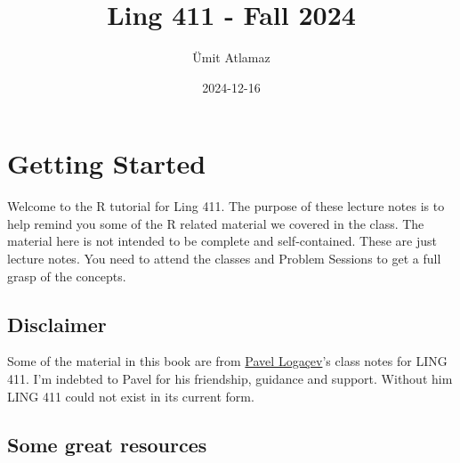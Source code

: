 \documentclass[
]{book}
\title{Ling 411 - Fall 2024}
\author{Ümit Atlamaz}
\date{2024-12-16}
\newenvironment{Shaded}{\begin{snugshade}}{\end{snugshade}}
\newcommand{\AttributeTok}[1]{\textcolor[rgb]{0.13,0.29,0.53}{#1}}
\newcommand{\CommentTok}[1]{\textcolor[rgb]{0.56,0.35,0.01}{\textit{#1}}}
\newcommand{\DecValTok}[1]{\textcolor[rgb]{0.00,0.00,0.81}{#1}}
\newcommand{\FunctionTok}[1]{\textcolor[rgb]{0.13,0.29,0.53}{\textbf{#1}}}
\newcommand{\NormalTok}[1]{#1}
\newcommand{\SpecialCharTok}[1]{\textcolor[rgb]{0.81,0.36,0.00}{\textbf{#1}}}
\newcommand{\StringTok}[1]{\textcolor[rgb]{0.31,0.60,0.02}{#1}}
\begin{document}
\maketitle

{
\setcounter{tocdepth}{1}
\tableofcontents
}
\begin{Shaded}
\end{Shaded}

\chapter{Getting Started}\label{getting-started}

Welcome to the R tutorial for Ling 411. The purpose of these lecture notes is to help remind you some of the R related material we covered in the class. The material here is not intended to be complete and self-contained. These are just lecture notes. You need to attend the classes and Problem Sessions to get a full grasp of the concepts.

\section{Disclaimer}\label{disclaimer}

Some of the material in this book are from \href{https://scholar.google.com/citations?user=fhbdTJIAAAAJ&hl=tr}{Pavel Logaçev}'s class notes for LING 411. I'm indebted to Pavel for his friendship, guidance and support. Without him LING 411 could not exist in its current form.

\section{Some great resources}\label{some-great-resources}
\end{document}
